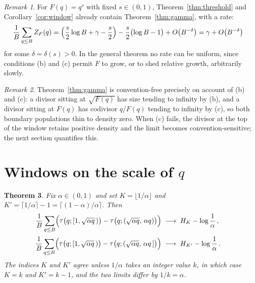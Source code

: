 \documentclass[11pt]{amsart}
\newtheorem{theorem}{Theorem}
\theoremstyle{remark}
\newtheorem{remark}[theorem]{Remark}
\newcommand{\eul}{\gamma}
\DeclareMathOperator{\divc}{\tau}
\begin{document}
\begin{remark}\label{rem:power}
For $F(q)=q^{s}$ with fixed $s\in(0,1)$, Theorem~\ref{thm:threshold}
and Corollary~\ref{cor:window} already contain
Theorem~\ref{thm:gamma}, with a rate:
\[
\frac1B\sum_{q\le B}Z_{F}(q)
=\Bigl(\frac{s}{2}\log B+\eul-\frac{s}{2}\Bigr)
-\frac{s}{2}\bigl(\log B-1\bigr)+O\bigl(B^{-\delta}\bigr)
=\eul+O\bigl(B^{-\delta}\bigr)
\]
for some $\delta=\delta(s)>0$.  In the general theorem no rate can be
uniform, since conditions (b) and (c) permit $F$ to grow, or to shed
relative growth, arbitrarily slowly.
\end{remark}

\begin{remark}\label{rem:conventions}
Theorem~\ref{thm:gamma} is convention-free precisely on account of (b)
and (c): a divisor sitting at $\sqrt{F(q)}$ has size tending to
infinity by (b), and a divisor sitting at $F(q)$ has codivisor
$q/F(q)$ tending to infinity by (c), so both boundary populations thin
to density zero.  When (c) fails, the divisor at the top of the window
retains positive density and the limit becomes convention-sensitive;
the next section quantifies this.
\end{remark}

\section{Windows on the scale of $q$}\label{sec:scaled}

\begin{theorem}\label{thm:scaled}
Fix $\alpha\in(0,1)$ and set $K=\lfloor1/\alpha\rfloor$ and
$K'=\lceil1/\alpha\rceil-1=\bigl\lceil(1-\alpha)/\alpha\bigr\rceil$.
Then
\begin{align}
\frac1B\sum_{q\le B}
\Bigl(\divc\bigl(q;[1,\sqrt{\alpha q}\,)\bigr)
-\divc\bigl(q;(\sqrt{\alpha q},\,\alpha q)\bigr)\Bigr)
&\;\longrightarrow\;H_{K}-\log\frac1\alpha\,,
\label{eq:open}\\[2pt]
\frac1B\sum_{q\le B}
\Bigl(\divc\bigl(q;[1,\sqrt{\alpha q}\,)\bigr)
-\divc\bigl(q;(\sqrt{\alpha q},\,\alpha q\,]\bigr)\Bigr)
&\;\longrightarrow\;H_{K'}-\log\frac1\alpha\,.
\label{eq:closed}
\end{align}
The indices $K$ and $K'$ agree unless $1/\alpha$ takes an integer value
$k$, in which case $K=k$ and $K'=k-1$, and the two limits differ by
$1/k=\alpha$.
\end{theorem}
\end{document}
